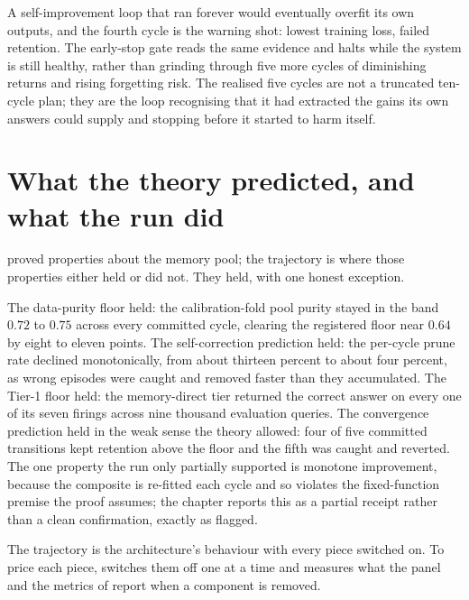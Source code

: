 \begin{intuition}
A self-improvement loop that ran forever would eventually overfit its own outputs, and
the fourth cycle is the warning shot: lowest training loss, failed retention. The
early-stop gate reads the same evidence and halts while the system is still healthy,
rather than grinding through five more cycles of diminishing returns and rising
forgetting risk. The realised five cycles are not a truncated ten-cycle plan; they are
the loop recognising that it had extracted the gains its own answers could supply and
stopping before it started to harm itself.
\end{intuition}

\section{What the theory predicted, and what the run did}
\label{sec:traj-theory}

 proved properties about the memory pool; the trajectory is where those
properties either held or did not. They held, with one honest exception.

\begin{bythenumbers}
The data-purity floor held: the calibration-fold pool purity stayed in the band $0.72$
to $0.75$ across every committed cycle, clearing the registered floor near $0.64$ by
eight to eleven points. The self-correction prediction held: the per-cycle prune rate
declined monotonically, from about thirteen percent to about four percent, as wrong
episodes were caught and removed faster than they accumulated. The Tier-1 floor held:
the memory-direct tier returned the correct answer on every one of its seven firings
across nine thousand evaluation queries. The convergence prediction held in the weak
sense the theory allowed: four of five committed transitions kept retention above the
floor and the fifth was caught and reverted. The one property the run only partially
supported is monotone improvement, because the composite is re-fitted each cycle and so
violates the fixed-function premise the proof assumes; the chapter reports this as a
partial receipt rather than a clean confirmation, exactly as  flagged.
\end{bythenumbers}

The trajectory is the architecture's behaviour with every piece switched on. To price
each piece,  switches them off one at a time and measures what the
panel and the metrics of  report when a component is removed.
